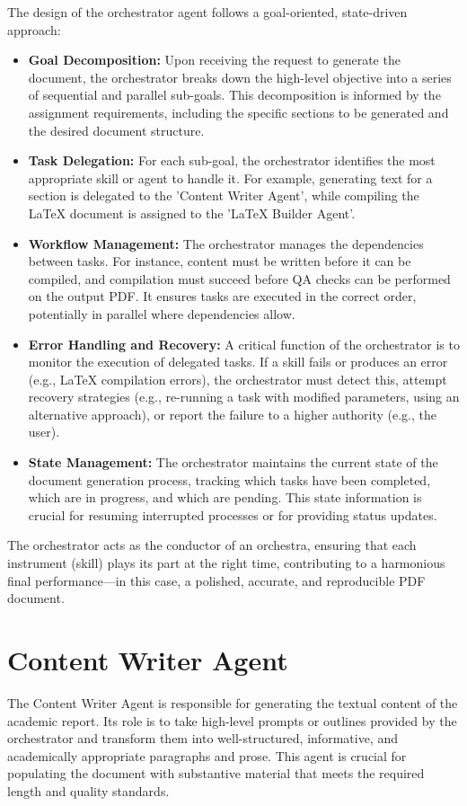\documentclass{custom-academic-template}
\begin{document}
The design of the orchestrator agent follows a goal-oriented, state-driven approach:
\begin{itemize}
    \item 	\textbf{Goal Decomposition:} Upon receiving the request to generate the document, the orchestrator breaks down the high-level objective into a series of sequential and parallel sub-goals. This decomposition is informed by the assignment requirements, including the specific sections to be generated and the desired document structure.
    \item 	\textbf{Task Delegation:} For each sub-goal, the orchestrator identifies the most appropriate skill or agent to handle it. For example, generating text for a section is delegated to the 'Content Writer Agent', while compiling the LaTeX document is assigned to the 'LaTeX Builder Agent'.
    \item 	\textbf{Workflow Management:} The orchestrator manages the dependencies between tasks. For instance, content must be written before it can be compiled, and compilation must succeed before QA checks can be performed on the output PDF. It ensures tasks are executed in the correct order, potentially in parallel where dependencies allow.
    \item 	\textbf{Error Handling and Recovery:} A critical function of the orchestrator is to monitor the execution of delegated tasks. If a skill fails or produces an error (e.g., LaTeX compilation errors), the orchestrator must detect this, attempt recovery strategies (e.g., re-running a task with modified parameters, using an alternative approach), or report the failure to a higher authority (e.g., the user).
    \item 	\textbf{State Management:} The orchestrator maintains the current state of the document generation process, tracking which tasks have been completed, which are in progress, and which are pending. This state information is crucial for resuming interrupted processes or for providing status updates.
\end{itemize}
The orchestrator acts as the conductor of an orchestra, ensuring that each instrument (skill) plays its part at the right time, contributing to a harmonious final performance—in this case, a polished, accurate, and reproducible PDF document.

\section{Content Writer Agent}
The Content Writer Agent is responsible for generating the textual content of the academic report. Its role is to take high-level prompts or outlines provided by the orchestrator and transform them into well-structured, informative, and academically appropriate paragraphs and prose. This agent is crucial for populating the document with substantive material that meets the required length and quality standards.
\end{document}
